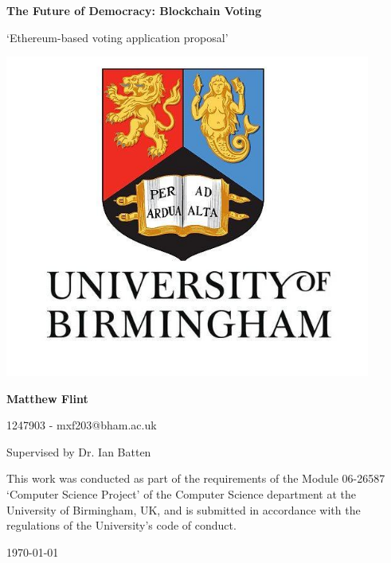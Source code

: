 \documentclass{article}
\begin{document}
    \begin{center}
        \Large
        \textbf{The Future of Democracy: Blockchain Voting}
        
        \vspace{0.2cm}
        \large
        `Ethereum-based voting application proposal'
        
        \vspace{1cm}
        \includegraphics[width=0.9\textwidth]{university}

        \vfill
        
        \large
        \textbf{Matthew Flint}
        
        \vspace{0.3cm}
        \normalsize
        1247903 - mxf203@bham.ac.uk
        
        \vspace{0.3cm}
        \normalsize
        Supervised by Dr. Ian Batten
        
        \vspace{0.5cm}
		This work was conducted as part of the requirements of the Module 06-26587 `Computer Science Project' of the Computer Science department at the University of Birmingham, UK, and is submitted in accordance with the regulations of the University's code of conduct.
		
		\vspace{0.2cm}
		\today
		
    \end{center}
    \newpage
\end{document}
